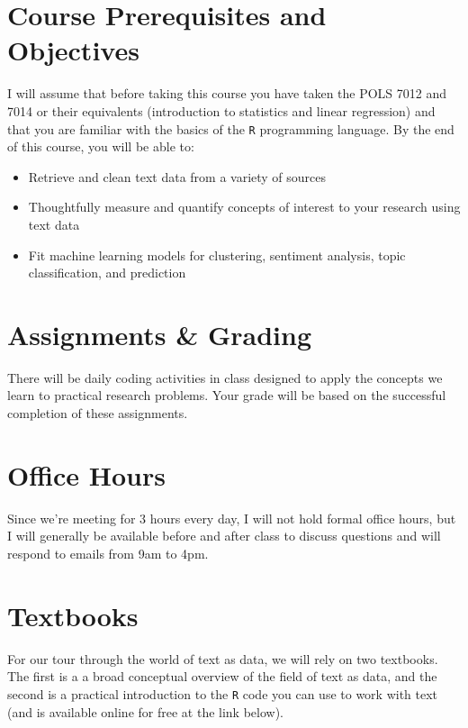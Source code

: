 \documentclass[11pt, letterpaper]{article}
\begin{document}
\section*{Course Prerequisites and Objectives}
I will assume that before taking this course you have taken the POLS 7012 and 7014 or their equivalents (introduction to statistics and linear regression) and that you are familiar with the basics of the \texttt{R} programming language. By the end of this course, you will be able to:
\begin{itemize}
	\item Retrieve and clean text data from a variety of sources
	\item Thoughtfully measure and quantify concepts of interest to your research using text data
	\item Fit machine learning models for clustering, sentiment analysis, topic classification, and prediction
\end{itemize}


\section*{Assignments \& Grading}

There will be daily coding activities in class designed to apply the concepts we learn to practical research problems. Your grade will be based on the successful completion of these assignments. 

\section*{Office Hours}

Since we're meeting for 3 hours every day, I will not hold formal office hours, but I will generally be available before and after class to discuss questions and will respond to emails from 9am to 4pm.

\section*{Textbooks}

For our tour through the world of text as data, we will rely on two textbooks. The first is a a broad conceptual overview of the field of text as data, and the second is a practical introduction to the \texttt{R} code you can use to work with text (and is available online for free at the link below).
\end{document}
